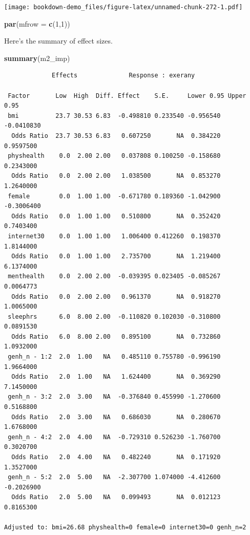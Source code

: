 \documentclass[]{book}
\newenvironment{Shaded}{\begin{snugshade}}{\end{snugshade}}
\newcommand{\KeywordTok}[1]{\textcolor[rgb]{0.13,0.29,0.53}{\textbf{#1}}}
\newcommand{\DataTypeTok}[1]{\textcolor[rgb]{0.13,0.29,0.53}{#1}}
\newcommand{\DecValTok}[1]{\textcolor[rgb]{0.00,0.00,0.81}{#1}}
\newcommand{\NormalTok}[1]{#1}
\theoremstyle{definition}
\theoremstyle{definition}
\theoremstyle{definition}
\theoremstyle{remark}
\begin{document}
\texttt{[image: bookdown-demo\_files/figure-latex/unnamed-chunk-272-1.pdf]}

\begin{Shaded}
\begin{Highlighting}[]
\KeywordTok{par}\NormalTok{(}\DataTypeTok{mfrow =} \KeywordTok{c}\NormalTok{(}\DecValTok{1}\NormalTok{,}\DecValTok{1}\NormalTok{))}
\end{Highlighting}
\end{Shaded}

Here's the summary of effect sizes.

\begin{Shaded}
\begin{Highlighting}[]
\KeywordTok{summary}\NormalTok{(m2_imp)}
\end{Highlighting}
\end{Shaded}

\begin{verbatim}
             Effects              Response : exerany 

 Factor       Low  High  Diff. Effect    S.E.     Lower 0.95 Upper 0.95
 bmi          23.7 30.53 6.83  -0.498810 0.233540 -0.956540  -0.0410830
  Odds Ratio  23.7 30.53 6.83   0.607250       NA  0.384220   0.9597500
 physhealth    0.0  2.00 2.00   0.037808 0.100250 -0.158680   0.2343000
  Odds Ratio   0.0  2.00 2.00   1.038500       NA  0.853270   1.2640000
 female        0.0  1.00 1.00  -0.671780 0.189360 -1.042900  -0.3006400
  Odds Ratio   0.0  1.00 1.00   0.510800       NA  0.352420   0.7403400
 internet30    0.0  1.00 1.00   1.006400 0.412260  0.198370   1.8144000
  Odds Ratio   0.0  1.00 1.00   2.735700       NA  1.219400   6.1374000
 menthealth    0.0  2.00 2.00  -0.039395 0.023405 -0.085267   0.0064773
  Odds Ratio   0.0  2.00 2.00   0.961370       NA  0.918270   1.0065000
 sleephrs      6.0  8.00 2.00  -0.110820 0.102030 -0.310800   0.0891530
  Odds Ratio   6.0  8.00 2.00   0.895100       NA  0.732860   1.0932000
 genh_n - 1:2  2.0  1.00   NA   0.485110 0.755780 -0.996190   1.9664000
  Odds Ratio   2.0  1.00   NA   1.624400       NA  0.369290   7.1450000
 genh_n - 3:2  2.0  3.00   NA  -0.376840 0.455990 -1.270600   0.5168800
  Odds Ratio   2.0  3.00   NA   0.686030       NA  0.280670   1.6768000
 genh_n - 4:2  2.0  4.00   NA  -0.729310 0.526230 -1.760700   0.3020700
  Odds Ratio   2.0  4.00   NA   0.482240       NA  0.171920   1.3527000
 genh_n - 5:2  2.0  5.00   NA  -2.307700 1.074000 -4.412600  -0.2026900
  Odds Ratio   2.0  5.00   NA   0.099493       NA  0.012123   0.8165300

Adjusted to: bmi=26.68 physhealth=0 female=0 internet30=0 genh_n=2  
\end{verbatim}
\end{document}
